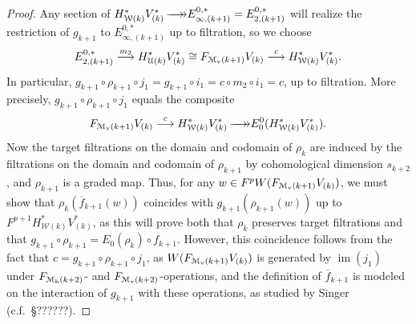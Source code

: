\documentclass[11pt]{amsart}
\theoremstyle{plain}
\theoremstyle{definition}
\DeclareMathOperator{\im}{im}
\renewcommand{\to}{\longrightarrow}
\newcommand{\calW}{\mathcal{W}}
\newcommand{\calU}{\mathcal{U}}
\newcommand{\calM}{\mathcal{M}}
\theoremstyle{plain}
\newcommand{\epi}{{\,\makebox[0cm][l]{\ensuremath\to}\to}}
\begin{document}
\begin{Calculations of HWn for n nonzero}
\begin{proof}

Any section of $H^*_{\calW(k)}V^*_{(k)}\epi E_{\infty,(k+1)}^{0,*}=E_{2,(k+1)}^{0,*}$ will realize the restriction of $g_{k+1}$ to $E_{\infty,(k+1)}^{0,*}$ up to filtration, so we choose
\[E_{2,(k+1)}^{0,*}\overset{m_2}{\to} H^*_{\calU(k)}V^*_{(k)}\cong F_{\calM_\textup{v}(k+1)}V_{(k)}\overset{c}{\to}H_{\calW(k)}^{*}V^{*}_{(k)}.\]
In particular, $g_{k+1}\circ \rho_{k+1}\circ j_1=g_{k+1}\circ i_1=c\circ m_2\circ i_1=c$, up to filtration. More precisely, $g_{k+1}\circ \rho_{k+1}\circ j_1$ equals the composite
\begin{gather*}
F_{\calM_\textup{v}(k+1)}V_{(k)}\overset{c}{\to} H_{\calW(k)}^{*}V^{*}_{(k)}\epi E_0^0(H_{\calW(k)}^{*}V^{*}_{(k)}).
\end{gather*}
Now the target filtrations on the domain and codomain of $\rho_k$ are induced by the filtrations on the domain and codomain of $\rho_{k+1}$ by cohomological dimension $s_{k+2}$, and $\rho_{k+1}$ is a graded map. Thus, for any $w\in F^pW(F_{\calM_\textup{v}(k+1)}V_{(k)})$, we must show that $\rho_k(\overline{f}_{k+1}(w))$ coincides with $g_{k+1}(\rho_{k+1}(w))$ up to $F^{p+1}H_{\calW(k)}^{*}V^{*}_{(k)}$, as this will prove both that $\rho_k$ preserves target filtrations and that  $g_{k+1}\circ \rho_{k+1}=E_0(\rho_{k})\circ f_{k+1}$. However, this coincidence follows from the fact that $c=g_{k+1}\circ \rho_{k+1}\circ j_1$, as $W(F_{\calM_\textup{v}(k+1)}V_{(k)})$ is generated by $\im(j_1)$ under $F_{\calM_\textup{h}(k+2)}$- and $F_{\calM_\textup{v}(k+2)}$-operations, and the definition of $\overline{f}_{k+1}$ is modeled on the interaction of $g_{k+1}$ with these operations, as studied by Singer (c.f.\ \S??????).


\end{proof}
\end{Calculations of HWn for n nonzero}
\end{document}
